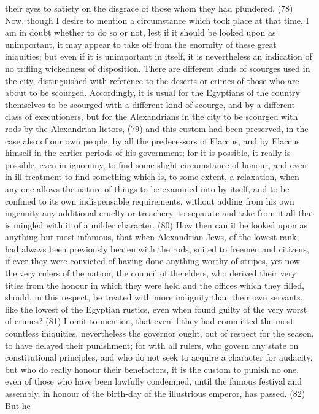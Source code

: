 their eyes to satiety on the disgrace of those whom they had plundered. (78) Now, though I desire
to mention a circumstance which took place at that time, I am in doubt whether to do so or not, lest
if it should be looked upon as unimportant, it may appear to take off from the enormity of these
great iniquities; but even if it is unimportant in itself, it is nevertheless an indication of no trifling
wickedness of disposition. There are different kinds of scourges used in the city, distinguished with
reference to the deserts or crimes of those who are about to be scourged. Accordingly, it is usual
for the Egyptians of the country themselves to be scourged with a different kind of scourge, and by
a different class of executioners, but for the Alexandrians in the city to be scourged with rods by
the Alexandrian lictors, (79) and this custom had been preserved, in the case also of our own
people, by all the predecessors of Flaccus, and by Flaccus himself in the earlier periods of his
government; for it is possible, it really is possible, even in ignominy, to find some slight
circumstance of honour, and even in ill treatment to find something which is, to some extent, a
relaxation, when any one allows the nature of things to be examined into by itself, and to be
confined to its own indispensable requirements, without adding from his own ingenuity any
additional cruelty or treachery, to separate and take from it all that is mingled with it of a milder
character. (80) How then can it be looked upon as anything but most infamous, that when
Alexandrian Jews, of the lowest rank, had always been previously beaten with the rods, suited to
freemen and citizens, if ever they were convicted of having done anything worthy of stripes, yet
now the very rulers of the nation, the council of the elders, who derived their very titles from the
honour in which they were held and the offices which they filled, should, in this respect, be treated
with more indignity than their own servants, like the lowest of the Egyptian rustics, even when found
guilty of the very worst of crimes? (81) I omit to mention, that even if they had committed the most
countless iniquities, nevertheless the governor ought, out of respect for the season, to have
delayed their punishment; for with all rulers, who govern any state on constitutional principles, and
who do not seek to acquire a character for audacity, but who do really honour their benefactors, it
is the custom to punish no one, even of those who have been lawfully condemned, until the famous
festival and assembly, in honour of the birth-day of the illustrious emperor, has passed. (82) But he
